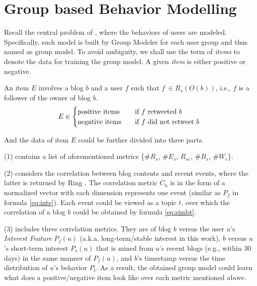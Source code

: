\section{Group based Behavior Modelling}
\label{sec:gm}


Recall the central problem of \sys{}, where the \retg{} behaviors of users are modeled.
Specifically, such model is built by Group Modeler for each user group and thus named as group model.
To avoid ambiguity, we shall use the term of \textit{items} to denote the data for training the group model.
A given \textit{item} is either positive or negative.

\begin{definition}
\label{def:gm-it}
An item $E$ involves a blog $b$ and a user $f$ such that $f\ \in R_s(O(b))$, i.e., $f$ is a follower of  the owner of blog $b$.
\begin{equation}
\label{eq:gm-it}
E \in
  \begin{cases}
    \text{positive items}       & \quad \text{if } f \text{ retweeted{} } b\\
    \text{negative items}  		& \quad \text{if } f \text{ did not retweet{} } b
  \end{cases}
\end{equation}
\end{definition}

And the data of item $E$ could be further divided into three parts.

	\stab(1)  contains a list of aforementioned metrics \{\#$R_s$, \#$E_s$, $R_{ee}$, \#$B_s$, \#$W_r$\}.
	
	\stab(2)  considers the correlation between blog contents and recent events, where the latter is returned by Ring \cite{IEEEexample:ring}. The correlation metric $C_h$ is in the form of a normalized vector with each dimension represents one event (similar as $P_f$ in formula \ref{eq:inte}). Each event could be viewed as a topic $t$, over which the correlation of a blog $b$ could be obtained by formula \ref{eq:simbt}.
	
	\stab(3)  includes three correlation metrics. They are of blog $b$ versus the user $u$'s \textit{Interest Feature} $P_f(u)$ (a.k.a. long-term/stable interest in this work), $b$ versus $u$'s short-term interest $P_s(u)$ that is mined from $u$'s recent blogs (e.g., within 30 days) in the same manner of $P_f(u)$, and $b$'s timestamp versus the time distribution of $u$'s \retg{} behavior $P_t$.
As a result, the obtained group model could learn what does a positive/negative item look like over each metric mentioned above.









